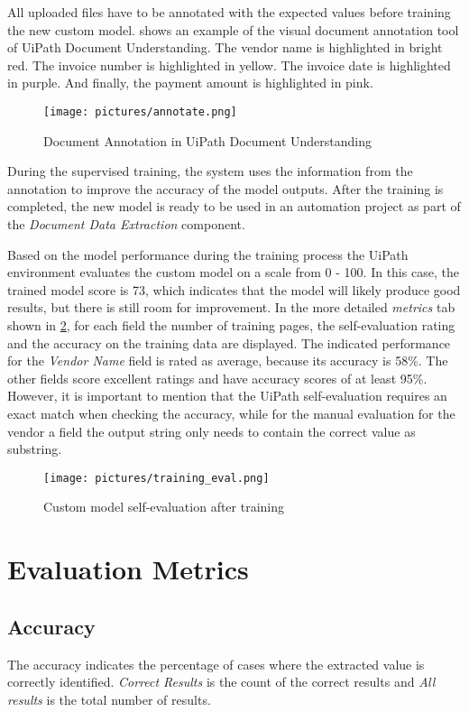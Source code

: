 All uploaded files have to be annotated with the expected values before training the new custom model.
 shows an example of the visual document annotation tool of UiPath Document Understanding. The vendor name is highlighted in bright red. The invoice number is highlighted in yellow. The invoice date is highlighted in purple. And finally, the payment amount is highlighted in pink.

\begin{figure}[ht]
    \centering
    \texttt{[image: pictures/annotate.png]}
    \caption{Document Annotation in UiPath Document Understanding}
    \label{fig:annotate}
\end{figure}

During the supervised training, the system uses the information from the annotation to improve the accuracy of the model outputs. After the training is completed, the new model is ready to be used in an automation project as part of the \textit{Document Data Extraction} component. 

Based on the model performance during the training process the UiPath environment evaluates the custom model on a scale from 0 - 100. In this case, the trained model score is 73, which indicates that the model will likely produce good results, but there is still room for improvement. In the more detailed \textit{metrics} tab shown in \cref{fig:train-eval}, for each field the number of training pages, the self-evaluation rating and the accuracy on the training data are displayed. 
The indicated performance for the \textit{Vendor Name} field is rated as average, because its accuracy is 58\%. The other fields score excellent ratings and have accuracy scores of at least 95\%. However, it is important to mention that the UiPath self-evaluation requires an exact match when checking the accuracy, while for the manual evaluation for the vendor a field the output string only needs to contain the correct value as substring.

\begin{figure}[ht]
    \centering
    \texttt{[image: pictures/training\_eval.png]}
    \caption{Custom model self-evaluation after training}
    \label{fig:train-eval}
\end{figure}

\newpage
\section{Evaluation Metrics}
\subsection{Accuracy}
The accuracy indicates the percentage of cases where the extracted value is correctly identified. \textit{Correct Results} is the count of the correct results and \textit{All results} is the total number of results.

